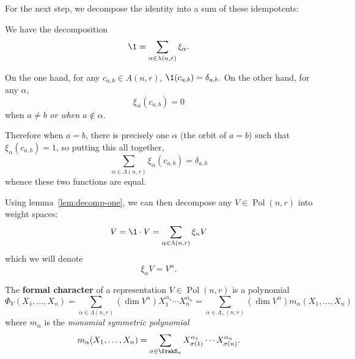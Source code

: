 \documentclass[12pt]{article}
\DeclareMathOperator{\Pol}{Pol}
\begin{document}
For the next step, we decompose the identity into a sum of these idempotents:
\begin{lem}\label{lem:decomp-one}
	We have the decomposition 
	\[\1 = \sum_{\alpha\in\lambda(n,r)} \xi_\alpha.\]
\end{lem}
\begin{prf}
	On the one hand, for any $c_{a,b}\in A(n,r)$, $\1(c_{a,b})=\delta_{a,b}$. On the other hand, for any $\alpha$,
	\[\xi_\alpha(c_{a,b})=0\]
	when $a\ne b$ \textit{or when $a\notin \alpha$}. 
	
	Therefore when $a=b$, there is precisely one $\alpha$ (the orbit of $a=b$)
	such that $\xi_\alpha(c_{a,b})=1$, so putting this all together,
	\[\sum_{\alpha\in\Lambda(n,r)}\xi_\alpha(c_{a,b})=\delta_{a,b}\]
	whence these two functions are equal.
\end{prf}
\begin{rmk}\label{rmk-weight-spaces}
Using lemma~\ref{lem:decomp-one}, we can then decompose any $V\in \Pol(n,r)$ into weight spaces:
\[V=\1\cdot V=\sum_{\alpha\in\Lambda(n,r)}\xi_\alpha V\]
which we will denote 
\[\xi_\alpha V=V^\alpha.\]
\end{rmk}

\begin{defn}\label{defn:character}
	The \textbf{formal character} of a representation $V\in \Pol(n,r)$ is a polynomial 
	\[\Phi_V(X_1,\dots,X_n)=\sum_{\alpha\in\Lambda(n,r)}(\dim V^\alpha)X_1^{\alpha_1}\cdots X_n^{\alpha_n}=\sum_{\alpha\in\Lambda_+(n,r)}(\dim V^\alpha)m_\alpha(X_1,\dots,X_n)\]
	where $m_\alpha$ is the \textit{monomial symmetric polynomial}
	\[m_\alpha(X_1,\dots,X_n)=\sum_{\sigma\in\frakS_n}X_{\sigma(1)}^{\alpha_1}\cdots X_{\sigma(n)}^{\alpha_n}.\]
\end{defn}
\end{document}
